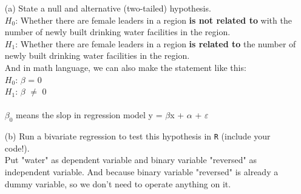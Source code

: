 \documentclass[12pt,letterpaper]{article}
\begin{document}
\newpage
\begin{enumerate}
	\item [(a)] State a null and alternative (two-tailed) hypothesis. 
	\vspace{.5cm} \\
	$H_0$: Whether there are female leaders in a region \textbf{is not related to} with the number of newly built drinking water facilities in the region. \\
	
	$H_1$: Whether there are female leaders in a region \textbf{is related to} the number of newly built drinking water facilities in the region. \\
	
	And in math language, we can also make the statement like this: \\
	
	$H_0$: $\beta$ = 0\\
	$H_1$: $\beta$ $\neq$ 0 \\
	\vspace{.5cm} \\
	$\beta_0$ means the slop in regression model y = $\beta$x + $\alpha$ + $\varepsilon$
		
	\newpage
	\item [(b)] Run a bivariate regression to test this hypothesis in \texttt{R} (include your code!).
	\vspace{.5cm}\\
	Put "water" as dependent variable and binary variable "reversed" as independent variable. And because binary variable "reversed" is already a dummy variable, so we don't need to operate anything on it.\\
	

\end{enumerate}
\end{document}
